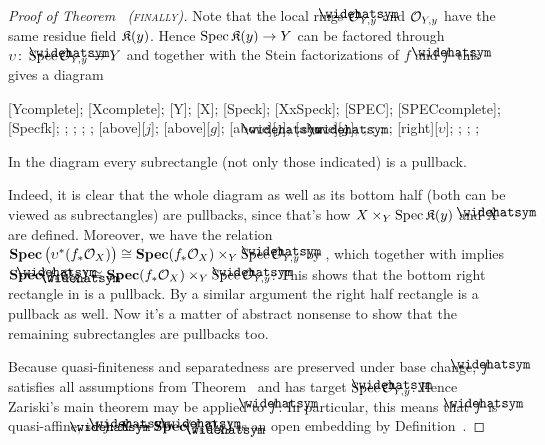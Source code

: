 \documentclass[a4paper,parskip=half,numbers=enddot, DIV=12]{scrreprt}
\begin{document}
\begin{proof}[Proof of Theorem~ \textsc{(finally)}]
Note that the local rings $\roof{\Oo}_{Y,y}$ and $\mathcal{O}_{Y,y}$ have the same residue field $\mathfrak{K}(y)$. Hence $\Spec \KK(y)\morphism Y$ can be factored through $\upsilon\colon \Spec \roof{\Oo}_{Y,y}\morphism Y$ and together with the Stein factorizations of $f$ and $\roof{f}$ this gives a diagram
\begin{diagram}
	[Ycomplete];
	[Xcomplete];
	;
	;
	[Speck];
	[XxSpeck];
	[SPEC];
	[SPECcomplete];
	[Specfk];
	;
	;
	;
	;
	\scriptsize
	[above][$j$];
	[above][$g$];
	[above][$\roof{\jmath}$];
	[above][$\roof{g}$];
	;
	;
	;
	;
	[right][$\upsilon$];
	;
	;
	;
\end{diagram}
\begin{claim}
	In the diagram  every subrectangle (not only those indicated) is a pullback.
\end{claim}
Indeed, it is clear that the whole diagram as well as its bottom half (both can be viewed as subrectangles) are pullbacks, since that's how $X\times_Y\operatorname{Spec} \mathfrak{K}(y)$ and $\roof{X}$ are defined. Moreover, we have the relation $\SPEC \big(\upsilon^*(f_*\Oo_X)\big)\cong \SPEC (f_*\Oo_X)\times_Y\Spec \roof{\Oo}_{Y,y}$ by \cite[Corollary~1.6.2]{alggeo2}, which together with  implies $\SPEC (\roof{f}_*\Oo_{\roof{X}})\cong \SPEC (f_*\Oo_X)\times_Y\Spec \roof{\Oo}_{Y,y}$. This shows that the bottom right rectangle in  is a pullback. By a similar argument the right half rectangle is a pullback as well. Now it's a matter of abstract nonsense to show that the remaining subrectangles are pullbacks too.

Because quasi-finiteness and separatedness are preserved under base change, $\roof{f}$ satisfies all assumptions from Theorem~ and has target $\Spec \roof{\Oo}_{Y,y}$. Hence Zariski's main theorem may be applied to $\roof{f}$. In particular, this means that $\roof{f}$ is quasi-affine, so $\roof \jmath \colon\roof{X}\morphism\SPEC (\roof{f}_*\Oo_{\roof{X}})$ is an open embedding  by Definition~. 


\end{proof}
\end{document}
